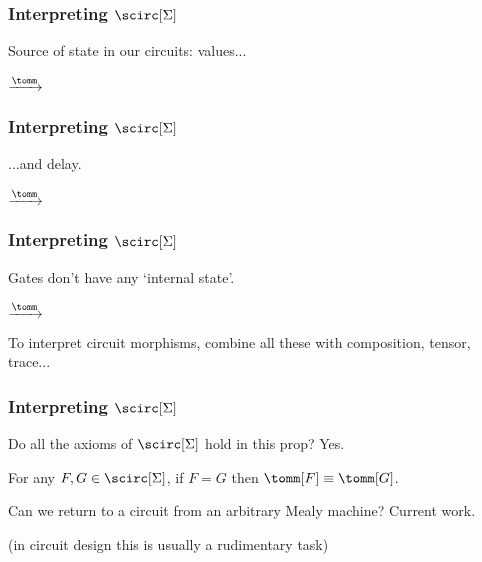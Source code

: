 \begin{frame}
    \frametitle{Interpreting $\scirc[\Sigma]$}    

    Source of \alert{state} in our circuits: \alert{values}...

    \pause

    \begin{center}
        \qquad
        \pause
        $\xrightarrow{\tomm}$
        \qquad
        \raisebox{-1.25em}{}
    \end{center}
\end{frame}

\begin{frame}
    \frametitle{Interpreting $\scirc[\Sigma]$}    
    ...and \alert{delay}.

    \pause
    \begin{center}
        \qquad
        \pause
        $\xrightarrow{\tomm}$
        \qquad
        \raisebox{-8em}{}
    \end{center}
\end{frame}


\begin{frame}
    \frametitle{Interpreting $\scirc[\Sigma]$}

    Gates don't have any `internal state'.

    \pause

    \begin{center}
        \qquad
        \pause
        $\xrightarrow{\tomm}$
        \qquad
        \raisebox{-1em}{}
    \end{center}

    \pause

    To interpret circuit morphisms, combine all these with composition, tensor, trace...

\end{frame}


\begin{frame}
    \frametitle{Interpreting $\scirc[\Sigma]$}

    Do all the axioms of $\scirc[\Sigma]$ hold in this prop? \pause \alert{Yes.}

    \pause

    \begin{theorem}
        For any $F,G \in \scirc[\Sigma]$, if $F = G$ then $\tomm[F] \equiv \tomm[G]$.
    \end{theorem}

    \pause

    Can we return to a circuit from an arbitrary Mealy machine? \pause \alert{Current work}.

    \pause

    (in circuit design this is usually a rudimentary task)

\end{frame}

